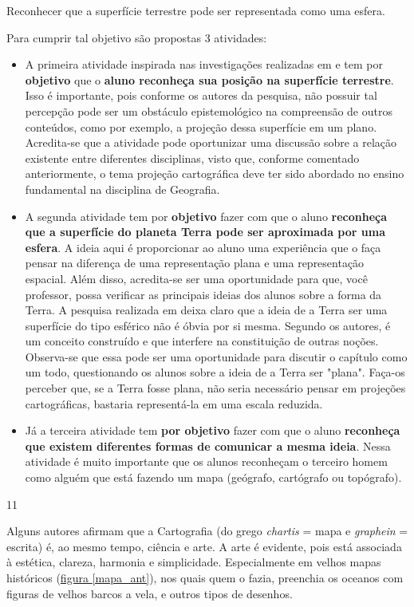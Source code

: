 \begin{objectives}{Reconhecer que a superfície terrestre pode ser representada como uma esfera.}
{
	Para cumprir tal objetivo são propostas 3 atividades:
	\begin{itemize}
  \item A primeira atividade inspirada nas investigações realizadas em \cite{Nussbaum} e \cite{Nardi}  tem por \textbf{objetivo} que o \textbf{aluno reconheça sua posição na superfície terrestre}. Isso é importante, pois conforme os autores da pesquisa, não possuir tal percepção pode ser um obstáculo epistemológico na compreensão de outros conteúdos, como por exemplo, a projeção dessa superfície em um plano. Acredita-se que a atividade pode oportunizar uma discussão sobre a relação existente entre diferentes disciplinas, visto que, conforme comentado anteriormente, o tema projeção cartográfica deve ter sido abordado no ensino fundamental na disciplina de Geografia.
  \item A segunda atividade tem por \textbf{objetivo} fazer com que o aluno \textbf{reconheça que a superfície do planeta Terra pode ser aproximada por uma esfera}. A ideia aqui é proporcionar ao aluno uma experiência que o faça pensar na diferença de uma representação plana e uma representação espacial. Além disso, acredita-se ser uma oportunidade para que, você professor, possa verificar as principais ideias dos alunos sobre a forma da Terra. A pesquisa realizada em \cite{Nussbaum1} deixa claro que a ideia de a Terra ser uma superfície do tipo esférico não é óbvia por si mesma. Segundo os autores, é um conceito construído e que interfere na constituição de outras noções. Observa-se que essa pode ser uma oportunidade para discutir o capítulo como um todo, questionando os alunos sobre a ideia de a Terra ser "plana". Faça-os perceber que, se a Terra fosse plana, não seria necessário pensar em projeções cartográficas, bastaria representá-la em uma escala reduzida.
  \item Já a terceira atividade tem \textbf{por objetivo} fazer com que o aluno \textbf{reconheça que existem diferentes formas de comunicar a mesma ideia}. Nessa atividade é muito importante que os alunos reconheçam o terceiro homem como alguém que está fazendo um mapa (geógrafo, cartógrafo ou topógrafo).
	\end{itemize}
}
{1}{1}
\end{objectives}

\label{cart_1}

Alguns autores afirmam que a Cartografia (do grego \textit{chartis} = mapa e \textit{graphein} = escrita) é, ao mesmo tempo, ciência e arte.  A arte é evidente, pois está associada à estética, clareza, harmonia e simplicidade. Especialmente em velhos mapas históricos (\hyperref[mapa_ant]{figura \ref{mapa_ant}}), nos quais quem o fazia, preenchia os oceanos com figuras de velhos barcos a vela, e outros tipos de desenhos.

